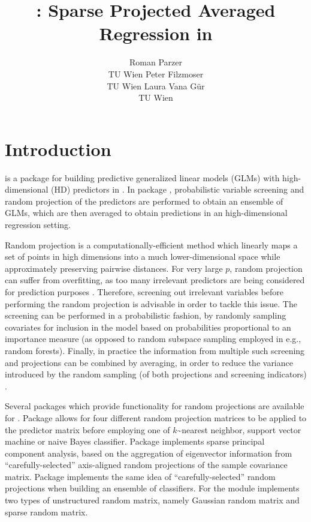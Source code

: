 \documentclass[
  article]{jss}
\author{Roman Parzer\\TU Wien \And Peter Filzmoser\\TU Wien \AND Laura
Vana Gür\\TU Wien}
\title{\pkg{SPAR}: Sparse Projected Averaged Regression in \proglang{R}}
\begin{document}
\maketitle


\section{Introduction}\label{sec-intro}

 is a package for building predictive generalized linear
models (GLMs) with high-dimensional (HD) predictors in . In
package , probabilistic variable screening and random
projection of the predictors are performed to obtain an ensemble of
GLMs, which are then averaged to obtain predictions in an
high-dimensional regression setting.

Random projection is a computationally-efficient method which linearly
maps a set of points in high dimensions into a much lower-dimensional
space while approximately preserving pairwise distances. For very large
\(p\), random projection can suffer from overfitting, as too many
irrelevant predictors are being considered for prediction purposes
\citep{Dunson2020TargRandProj}. Therefore, screening out irrelevant
variables before performing the random projection is advisable in order
to tackle this issue. The screening can be performed in a probabilistic
fashion, by randomly sampling covariates for inclusion in the model
based on probabilities proportional to an importance measure (as opposed
to random subspace sampling employed in e.g., random forests). Finally,
in practice the information from multiple such screening and projections
can be combined by averaging, in order to reduce the variance introduced
by the random sampling (of both projections and screening indicators)
\citep{Thanei2017RPforHDR}.

Several packages which provide functionality for random projections are
available for . Package 
\citep{RandProR, SIDDHARTH2020100629} allows for four different random
projection matrices to be applied to the predictor matrix before
employing one of \(k\)\textasciitilde nearest neighbor, support vector
machine or naive Bayes classifier. Package 
\citep{SPCAvRPR} implements sparse principal component analysis, based
on the aggregation of eigenvector information from
``carefully-selected'' axis-aligned random projections of the sample
covariance matrix. Package  \citep{RPEnsembleR}
implements the same idea of ``carefully-selected'' random projections
when building an ensemble of classifiers. For 
\citet{Python} the  module implements
two types of unstructured random matrix, namely Gaussian random matrix
and sparse random matrix.
\end{document}
